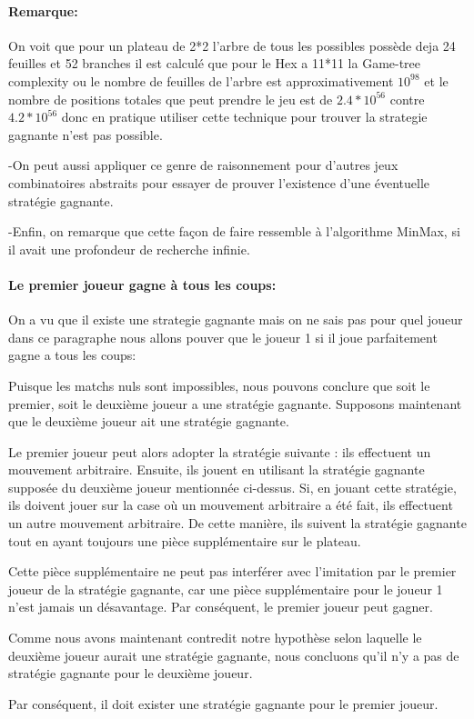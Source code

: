 \paragraph{Remarque:}
On voit que pour un plateau de 2*2 l'arbre de tous les possibles possède deja 24 feuilles et 52 branches
il est calculé que pour le Hex a 11*11 la Game-tree complexity ou le nombre de feuilles de l'arbre est
approximativement $10^{98}$ et le nombre de positions totales que peut prendre le jeu est de $2.4*10^{56}$ 
contre $4.2*10^{56}$ donc en pratique utiliser cette technique pour trouver la strategie gagnante 
n'est pas possible.

-On peut aussi appliquer ce genre de raisonnement pour d'autres jeux combinatoires abstraits pour essayer de
prouver l'existence d'une éventuelle stratégie gagnante.

-Enfin, on remarque que cette façon de faire ressemble à l'algorithme MinMax, si il avait une profondeur de recherche
infinie.


\paragraph{Le premier joueur gagne à tous les coups:}
On a vu que il existe une strategie gagnante mais on ne sais pas pour quel joueur dans ce paragraphe nous allons
pouver que le joueur 1 si il joue parfaitement gagne a tous les coups:

Puisque les matchs nuls sont impossibles, nous pouvons conclure que soit le premier, soit le deuxième joueur a une stratégie
gagnante. Supposons maintenant que le deuxième joueur ait une stratégie gagnante.

Le premier joueur peut alors adopter la stratégie suivante : ils effectuent un mouvement arbitraire. Ensuite, 
ils jouent en utilisant la stratégie gagnante supposée du deuxième joueur mentionnée ci-dessus. Si,
en jouant cette stratégie, ils doivent jouer sur la case où un mouvement arbitraire a été fait, ils effectuent
un autre mouvement arbitraire. De cette manière, ils suivent la stratégie gagnante tout en ayant toujours une pièce
supplémentaire sur le plateau.

Cette pièce supplémentaire ne peut pas interférer avec l'imitation par le premier joueur de la stratégie gagnante, 
car une pièce supplémentaire pour le joueur 1 n'est jamais un désavantage. Par conséquent, le premier joueur peut
gagner.

Comme nous avons maintenant contredit notre hypothèse selon laquelle le deuxième joueur aurait une stratégie gagnante,
nous concluons qu'il n'y a pas de stratégie gagnante pour le deuxième joueur.

Par conséquent, il doit exister une stratégie gagnante pour le premier joueur.